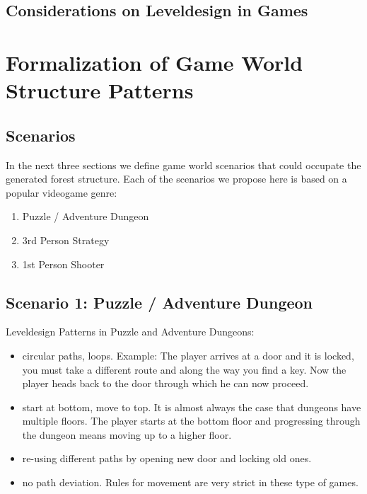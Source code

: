 
 
  

%
%



\section{Considerations on Leveldesign in Games}


\chapter{Formalization of Game World Structure Patterns}
\label{sec:scenarios}


\section{Scenarios} 
In the next three sections we define game world scenarios that could occupate the generated forest structure. Each of the scenarios we propose here is based on a popular videogame genre: 

\begin{enumerate}
\item Puzzle / Adventure Dungeon
\item 3rd Person Strategy 
\item 1st Person Shooter
\end{enumerate} 


\section{Scenario 1: Puzzle / Adventure Dungeon}
Leveldesign Patterns in Puzzle and Adventure Dungeons:

\begin{itemize}
\item circular paths, loops. Example: The player arrives at a door and it is locked, you must take a different route and along the way you find a key. Now the player heads back to the door through which he can now proceed.  
\item start at bottom, move to top. It is almost always the case that dungeons have multiple floors. The player starts at the bottom floor and progressing through the dungeon means moving up to a higher floor.      
\item re-using different paths by opening new door and locking old ones.    
\item no path deviation. Rules for movement are very strict in these type of games.

\end{itemize}

